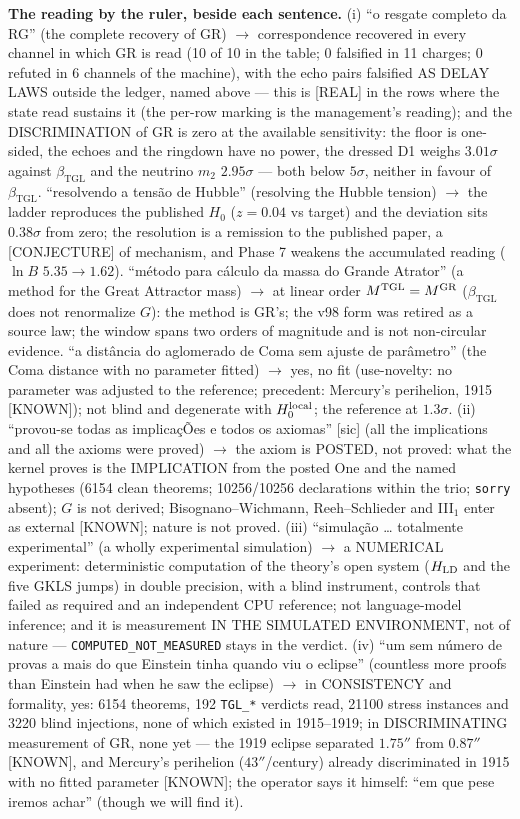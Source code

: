 \documentclass[11pt]{article}
\newcommand{\bTGL}{\beta_{\mathrm{TGL}}}\newcommand{\Msun}{M_{\odot}}\newcommand{\TGL}{\mathrm{TGL}}
\theoremstyle{definition}\newtheorem{deriv}{Derivation}
\begin{document}
\textbf{The reading by the ruler, beside each sentence.} (i) ``o resgate completo da RG'' (the complete recovery of GR) $\to$ correspondence recovered in every channel in which GR is read (10 of 10 in the table; 0 falsified in 11 charges; 0 refuted in 6 channels of the machine), with the echo pairs falsified AS DELAY LAWS outside the ledger, named above --- this is \textsf{[REAL]} in the rows where the state read sustains it (the per-row marking is the management's reading); and the DISCRIMINATION of GR is zero at the available sensitivity: the floor is one-sided, the echoes and the ringdown have no power, the dressed D1 weighs $3.01\sigma$ against $\bTGL$ and the neutrino $m_2$ $2.95\sigma$ --- both below $5\sigma$, neither in favour of $\bTGL$. ``resolvendo a tensão de Hubble'' (resolving the Hubble tension) $\to$ the ladder reproduces the published $H_0$ ($z=0.04$ vs target) and the deviation sits $0.38\sigma$ from zero; the resolution is a remission to the published paper, a \textsf{[CONJECTURE]} of mechanism, and Phase 7 weakens the accumulated reading ($\ln B$ $5.35\to1.62$). ``método para cálculo da massa do Grande Atrator'' (a method for the Great Attractor mass) $\to$ at linear order $M^{\rm TGL}=M^{\rm GR}$ ($\bTGL$ does not renormalize $G$): the method is GR's; the v98 form was retired as a source law; the window spans two orders of magnitude and is not non-circular evidence. ``a distância do aglomerado de Coma sem ajuste de parâmetro'' (the Coma distance with no parameter fitted) $\to$ yes, no fit (use-novelty: no parameter was adjusted to the reference; precedent: Mercury's perihelion, 1915 \textsf{[KNOWN]}); not blind and degenerate with $H_0^{\rm local}$; the reference at $1.3\sigma$. (ii) ``provou-se todas as implicaçÕes e todos os axiomas'' [sic] (all the implications and all the axioms were proved) $\to$ the axiom is POSTED, not proved: what the kernel proves is the IMPLICATION from the posted One and the named hypotheses (6154 clean theorems; 10256/10256 declarations within the trio; \texttt{sorry} absent); $G$ is not derived; Bisognano--Wichmann, Reeh--Schlieder and III$_1$ enter as external \textsf{[KNOWN]}; nature is not proved. (iii) ``simulação … totalmente experimental'' (a wholly experimental simulation) $\to$ a NUMERICAL experiment: deterministic computation of the theory's open system ($H_{\rm LD}$ and the five GKLS jumps) in double precision, with a blind instrument, controls that failed as required and an independent CPU reference; not language-model inference; and it is measurement IN THE SIMULATED ENVIRONMENT, not of nature --- \texttt{COMPUTED\_NOT\_MEASURED} stays in the verdict. (iv) ``um sem número de provas a mais do que Einstein tinha quando viu o eclipse'' (countless more proofs than Einstein had when he saw the eclipse) $\to$ in CONSISTENCY and formality, yes: 6154 theorems, 192 \texttt{TGL\_*} verdicts read, 21100 stress instances and 3220 blind injections, none of which existed in 1915--1919; in DISCRIMINATING measurement of GR, none yet --- the 1919 eclipse separated $1.75''$ from $0.87''$ \textsf{[KNOWN]}, and Mercury's perihelion ($43''$/century) already discriminated in 1915 with no fitted parameter \textsf{[KNOWN]}; the operator says it himself: ``em que pese iremos achar'' (though we will find it).
\end{document}
